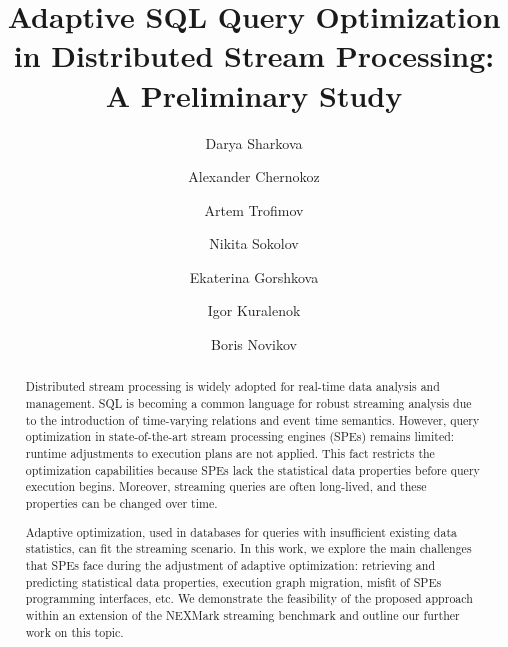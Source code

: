 \documentclass[runningheads]{llncs}
\begin{document}
%
\title{Adaptive SQL Query Optimization in Distributed Stream Processing: A Preliminary Study}
%
%
\author{Darya Sharkova \and
Alexander Chernokoz \and
Artem Trofimov \and
Nikita Sokolov \and
Ekaterina Gorshkova \and
Igor Kuralenok\and
Boris Novikov}
%
%
\maketitle              %
%
\begin{abstract}
Distributed stream processing is widely adopted for real-time data analysis and management. SQL is becoming a common language for robust streaming analysis due to the introduction of time-varying relations and event time semantics. However, query optimization in state-of-the-art stream processing engines (SPEs) remains limited: runtime adjustments to execution plans are not applied. This fact restricts the optimization capabilities because SPEs lack the statistical data properties before query execution begins. Moreover, streaming queries are often long-lived, and these properties can be changed over time. 

Adaptive optimization, used in databases for queries with insufficient existing data statistics, can fit the streaming scenario. In this work, we explore the main challenges that SPEs face during the adjustment of adaptive optimization: retrieving and predicting statistical data properties, execution graph migration, misfit of SPEs programming interfaces, etc. We demonstrate the feasibility of the proposed approach within an extension of the NEXMark streaming benchmark and outline our further work on this topic.

\end{abstract}
\end{document}
